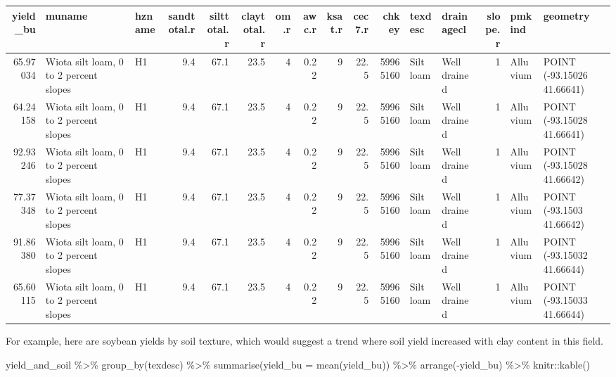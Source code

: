\documentclass[
]{book}
\newenvironment{Shaded}{\begin{snugshade}}{\end{snugshade}}
\newcommand{\AttributeTok}[1]{\textcolor[rgb]{0.77,0.63,0.00}{#1}}
\newcommand{\FunctionTok}[1]{\textcolor[rgb]{0.00,0.00,0.00}{#1}}
\newcommand{\NormalTok}[1]{#1}
\newcommand{\SpecialCharTok}[1]{\textcolor[rgb]{0.00,0.00,0.00}{#1}}
\begin{document}
\begin{tabular}{r|l|l|r|r|r|r|r|r|r|r|l|l|r|l|l}
\hline
yield\_bu & muname & hzname & sandtotal.r & silttotal.r & claytotal.r & om.r & awc.r & ksat.r & cec7.r & chkey & texdesc & drainagecl & slope.r & pmkind & geometry\\
\hline
65.97034 & Wiota silt loam, 0 to 2 percent slopes & H1 & 9.4 & 67.1 & 23.5 & 4 & 0.22 & 9 & 22.5 & 59965160 & Silt loam & Well drained & 1 & Alluvium & POINT (-93.15026 41.66641)\\
\hline
64.24158 & Wiota silt loam, 0 to 2 percent slopes & H1 & 9.4 & 67.1 & 23.5 & 4 & 0.22 & 9 & 22.5 & 59965160 & Silt loam & Well drained & 1 & Alluvium & POINT (-93.15028 41.66641)\\
\hline
92.93246 & Wiota silt loam, 0 to 2 percent slopes & H1 & 9.4 & 67.1 & 23.5 & 4 & 0.22 & 9 & 22.5 & 59965160 & Silt loam & Well drained & 1 & Alluvium & POINT (-93.15028 41.66642)\\
\hline
77.37348 & Wiota silt loam, 0 to 2 percent slopes & H1 & 9.4 & 67.1 & 23.5 & 4 & 0.22 & 9 & 22.5 & 59965160 & Silt loam & Well drained & 1 & Alluvium & POINT (-93.1503 41.66642)\\
\hline
91.86380 & Wiota silt loam, 0 to 2 percent slopes & H1 & 9.4 & 67.1 & 23.5 & 4 & 0.22 & 9 & 22.5 & 59965160 & Silt loam & Well drained & 1 & Alluvium & POINT (-93.15032 41.66644)\\
\hline
65.60115 & Wiota silt loam, 0 to 2 percent slopes & H1 & 9.4 & 67.1 & 23.5 & 4 & 0.22 & 9 & 22.5 & 59965160 & Silt loam & Well drained & 1 & Alluvium & POINT (-93.15033 41.66644)\\
\hline
\end{tabular}

For example, here are soybean yields by soil texture, which would suggest a trend where soil yield increased with clay content in this field.

\begin{Shaded}
\begin{Highlighting}[]
\NormalTok{yield\_and\_soil }\SpecialCharTok{\%\textgreater{}\%}
  \FunctionTok{group\_by}\NormalTok{(texdesc) }\SpecialCharTok{\%\textgreater{}\%}
  \FunctionTok{summarise}\NormalTok{(}\AttributeTok{yield\_bu =} \FunctionTok{mean}\NormalTok{(yield\_bu)) }\SpecialCharTok{\%\textgreater{}\%}
  \FunctionTok{arrange}\NormalTok{(}\SpecialCharTok{{-}}\NormalTok{yield\_bu) }\SpecialCharTok{\%\textgreater{}\%}
\NormalTok{  knitr}\SpecialCharTok{::}\FunctionTok{kable}\NormalTok{()}
\end{Highlighting}
\end{Shaded}
\end{document}
